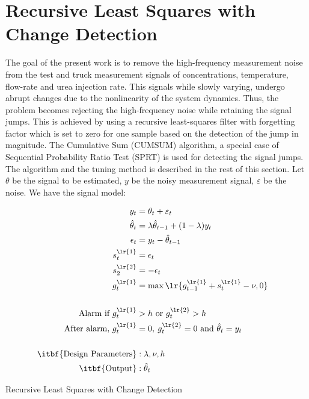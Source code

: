 \section{Recursive Least Squares with Change Detection}
The goal of the present work is to remove the high-frequency measurement noise from the test and truck measurement signals of concentrations, temperature, flow-rate and urea injection rate. This signals while slowly varying, undergo abrupt changes due to the nonlinearity of the system dynamics. Thus, the problem becomes rejecting the high-frequency noise while retaining the signal jumps. This is achieved by using a recursive least-squares filter with forgetting factor which is set to zero for one sample based on the detection of the jump in magnitude. The Cumulative Sum (CUMSUM) algorithm, a special case of Sequential Probability Ratio Test (SPRT) is used for detecting the signal jumps. The algorithm and the tuning method is described in the rest of this section. Let $\theta$ be the signal to be estimated, $y$ be the noisy measurement signal, $\varepsilon$ be the noise. We have the signal model:
\begin{algorithm}
\begin{align*}
        y_t &= \theta_t + \varepsilon_t\\
        \hat \theta_t &= \lambda \hat \theta_{t-1} + (1-\lambda) y_t \\
        \epsilon_t &= y_t - \hat \theta_{t-1} \\
        s^{\lr{1}}_t &= \epsilon_t \\
        s^{\lr{2}}_2 &= -\epsilon_t \\
        g_t^{\lr{1}} &= \max \lr{g_{t-1}^{\lr{1}} + s_t^{\lr{1}} - \nu, 0}\\
        &\\
        \text{Alarm if } g_t^{\lr{1}} &> h \text{ or } g_t^{\lr{2}} > h \\
        \text{After alarm, } g_t^{\lr{1}} &= 0, \: g_t^{\lr{2}} = 0 \text{ and } \hat \theta_t = y_t\\
        &\\
        \text{\itbf{Design Parameters}} &: \lambda, \nu, h&\\
        \text{\itbf{Output}} &: \hat \theta_t&
\end{align*}
\caption{Recursive Least Squares with Change Detection}
\end{algorithm}

